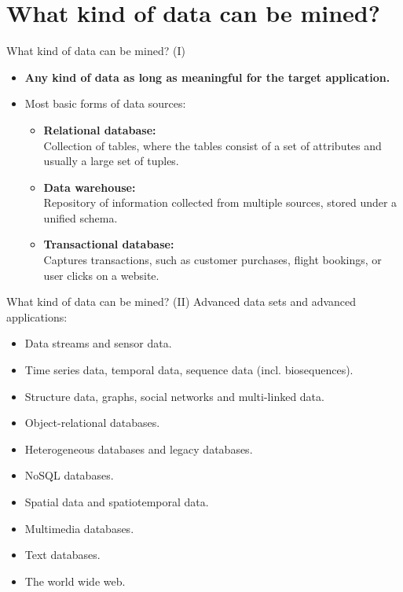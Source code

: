 \section{What kind of data can be mined?}

\begin{frame}{What kind of data can be mined? (I)}
	\begin{itemize}
		\item \textbf{Any kind of data as long as meaningful for the target
			      application.}
		\item Most basic forms of data sources:
		      \begin{itemize}
			      \item \textbf{Relational database:} \\
			            \small{Collection of tables, where the tables consist of a
				            set of attributes and usually a large set of tuples.}
			      \item \textbf{Data warehouse:} \\
			            \small{Repository of information collected from multiple
				            sources, stored under a unified schema.}
			      \item \textbf{Transactional database:} \\
			            \small{Captures transactions, such as customer purchases,
				            flight bookings, or user clicks on a website.}
		      \end{itemize}
	\end{itemize}
\end{frame}
\begin{frame}{What kind of data can be mined? (II)}
	Advanced data sets and advanced applications:
	\begin{itemize}
		\item Data streams and sensor data.
		\item Time series data, temporal data, sequence data (incl.
		      biosequences).
		\item Structure data, graphs, social networks and multi-linked data.
		\item Object-relational databases.
		\item Heterogeneous databases and legacy databases.
		\item NoSQL databases.
		\item Spatial data and spatiotemporal data.
		\item Multimedia databases.
		\item Text databases.
		\item The world wide web.
	\end{itemize}
\end{frame}

